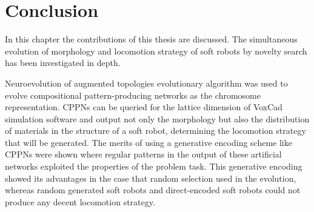

\chapter{Conclusion} %

\label{Conclusion} %


In this chapter the contributions of this thesis are discussed. The simultaneous evolution of morphology and locomotion strategy of soft robots by novelty search has been investigated in depth. 

Neuroevolution of augmented topologies evolutionary algorithm was used to evolve compositional pattern-producing networks as the chromosome representation. CPPNs can be queried for the lattice dimension of VoxCad simulation software and output not only the morphology but also the distribution of materials in the structure of a soft robot, determining the locomotion strategy that will be generated. The merits of using a generative encoding scheme like CPPNs were shown where regular patterns in the output of these artificial networks exploited the properties of the problem task. This generative encoding showed its advantages in the case that random selection used in the evolution, whereas random generated soft robots and direct-encoded soft robots could not produce any decent locomotion strategy. 

